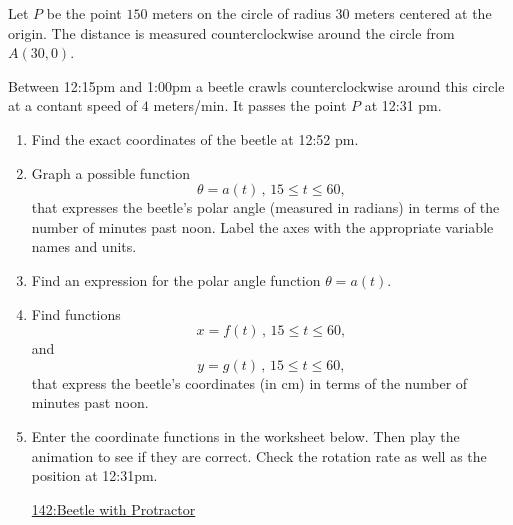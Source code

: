 \documentclass{ximera}
\begin{document}
\begin{question}  \label{QLDFg4tbbfg}
Let $P$ be the point $150$ meters on the circle of radius $30$ meters centered at the origin. The distance is measured counterclockwise around the circle from $A(30,0)$.
 
Between 12:15pm and 1:00pm a beetle crawls counterclockwise around this circle at a contant speed of $4$ meters/min. It passes the point $P$ at 12:31 pm.

\begin{enumerate}
\item Find the exact coordinates of the beetle at 12:52 pm.

\item Graph a possible function
\[
 \theta = a(t) \, , \, 15\leq t \leq 60 ,
\]
that expresses the beetle's polar angle (measured in radians) in terms of the number of minutes past noon. Label the axes with the appropriate variable names and units.

\item Find an expression for the polar angle function $\theta = a(t)$.

\item Find functions
\[
     x = f(t) \, , \, 15 \leq t \leq 60,
\]
and
\[
     y = g(t) \, , \, 15 \leq t \leq 60,
\]
that express the beetle's coordinates (in cm) in terms of the number of minutes past noon.

\item Enter the coordinate functions in the worksheet below. Then play the animation to see if they are correct. Check the rotation rate as well as the position at 12:31pm.

\begin{onlineOnly}
    \begin{center}
\end{center}
\end{onlineOnly}

\href{https://www.desmos.com/calculator/hidmxiwubv}{142:Beetle with Protractor}


\end{enumerate}

\end{question}
\end{document}
